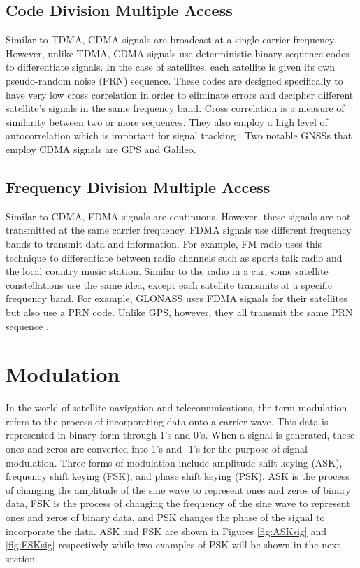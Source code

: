 \documentclass[12pt]{report}
\begin{document}
\subsection{Code Division Multiple Access}

Similar to TDMA, CDMA signals are broadcast at a single carrier frequency. However, unlike TDMA, CDMA signals use deterministic binary sequence codes to differentiate signals. In the case of satellites, each satellite is given its own pseudo-random noise (PRN) sequence. These codes are designed specifically to have very low cross correlation in order to eliminate errors and decipher different satellite's signals in the same frequency band. Cross correlation is a measure of similarity between two or more sequences. They also employ a high level of autocorrelation which is important for signal tracking \cite{goldOptimalBinarySequences1967}. Two notable GNSSs that employ CDMA signals are GPS and Galileo.

\subsection{Frequency Division Multiple Access}

Similar to CDMA, FDMA signals are continuous. However, these signals are not transmitted at the same carrier frequency. FDMA signals use different frequency bands to transmit data and information. For example, FM radio uses this technique to differentiate between radio channels such as sports talk radio and the local country music station. Similar to the radio in a car, some satellite constellations use the same idea, except each satellite transmits at a specific frequency band. For example, GLONASS uses FDMA signals for their satellites but also use a PRN code. Unlike GPS, however, they all transmit the same PRN sequence \cite{GLONASSSignalPlan}. 

\section{Modulation}
In the world of satellite navigation and telecomunications, the term modulation refers to the process of incorporating data onto a carrier wave. This data is represented in binary form through 1's and 0's. When a signal is generated, these ones and zeros are converted into 1's and -1's for the purpose of signal modulation. Three forms of modulation include amplitude shift keying (ASK), frequency shift keying (FSK), and phase shift keying (PSK). ASK is the process of changing the amplitude of the sine wave to represent ones and zeros of binary data, FSK is the process of changing the frequency of the sine wave to represent ones and zeros of binary data, and PSK changes the phase of the signal to incorporate the data. ASK and FSK are shown in Figures \ref{fig:ASKsig} and \ref{fig:FSKsig} respectively while two examples of PSK will be shown in the next section.
\end{document}
